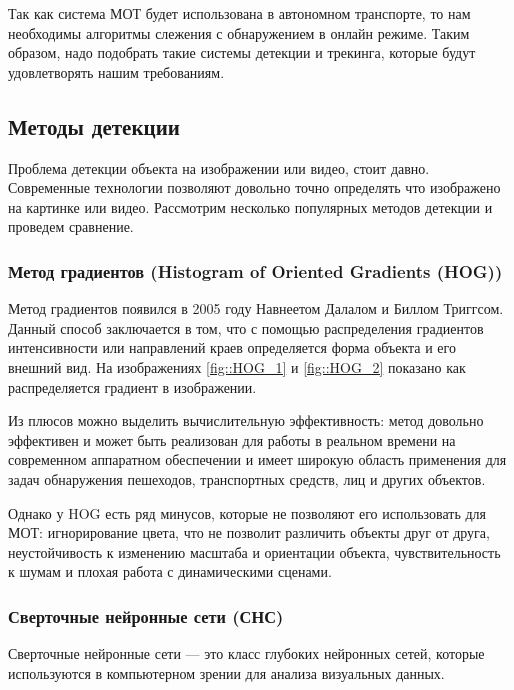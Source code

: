 Так как система МОТ будет использована в автономном транспорте, то нам необходимы алгоритмы слежения с обнаружением в онлайн режиме. Таким образом, надо подобрать такие системы детекции и трекинга, которые будут удовлетворять нашим требованиям.

\subsection{Методы детекции}\label{subsec:detector}

Проблема детекции объекта на изображении или видео, стоит давно. Современные технологии позволяют довольно точно определять что изображено на картинке или видео. Рассмотрим несколько популярных методов детекции и проведем сравнение.

\subsubsection{Метод градиентов (Histogram of Oriented Gradients (HOG))}

Метод градиентов появился в 2005 году Навнеетом Далалом и Биллом Триггсом. Данный способ заключается в том, что с помощью распределения градиентов интенсивности или направлений краев определяется форма объекта и его внешний вид. На изображениях \ref{fig::HOG_1} и \ref{fig::HOG_2} показано как распределяется градиент в изображении.


Из плюсов можно выделить вычислительную эффективность: метод довольно эффективен и может быть реализован для работы в реальном времени на современном аппаратном обеспечении и имеет широкую область применения для задач обнаружения пешеходов, транспортных средств, лиц и других объектов. 


Однако у HOG есть ряд минусов, которые не позволяют его использовать для МОТ: игнорирование цвета, что не позволит различить объекты друг от друга, неустойчивость к изменению масштаба и ориентации объекта, чувствительность к шумам и плохая работа с динамическими сценами.  

\subsubsection{Сверточные нейронные сети (СНС)}

Сверточные нейронные сети --- это класс глубоких нейронных сетей, которые используются в компьютерном зрении для анализа визуальных данных. 

